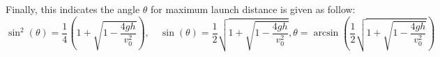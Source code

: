 \documentclass{article}
\newtheorem{question}{Question}
\begin{document}
Finally, this indicates the angle $\theta$ for maximum launch distance is given as follow:
$$\sin^2(\theta)=\frac{1}{4}\left(1+\sqrt{1-\frac{4gh}{v_0^2}}\right),\quad \sin(\theta)=\frac{1}{2}\sqrt{1+\sqrt{1-\frac{4gh}{v_0^2}}}, \theta = \arcsin\left(\frac{1}{2}\sqrt{1+\sqrt{1-\frac{4gh}{v_0^2}}}\right)$$

\break

\end{document}
